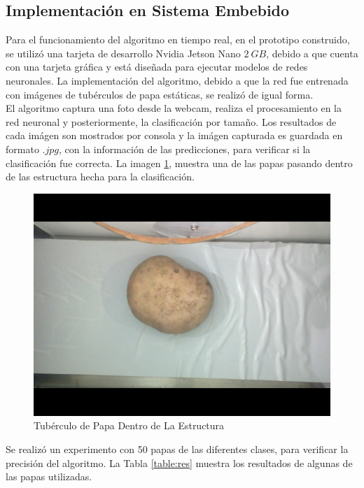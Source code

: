 	
	\subsection{Implementación en Sistema Embebido}
	
	Para el funcionamiento del algoritmo en tiempo real, en el prototipo construido, se utilizó una tarjeta de desarrollo Nvidia Jetson Nano $2 \ GB$, debido a que cuenta con una tarjeta gráfica y está diseñada para ejecutar modelos de redes neuronales. La implementación del algoritmo, debido a que la red fue entrenada con imágenes de tubérculos de papa estáticas, se realizó de igual forma.\\
	
	El algoritmo captura una foto desde la webcam, realiza el procesamiento en la red neuronal y posteriormente, la clasificación por tamaño. Los resultados de cada imágen son mostrados por consola y la imágen capturada es guardada en formato $.jpg$, con la información de las predicciones, para verificar si la clasificación fue correcta. La imagen \ref{fig:implementacion}, muestra una de las papas pasando dentro de las estructura hecha para la clasificación.
	
	\begin{figure}[ht]
		\centering
		\includegraphics[scale=0.25]{Figs/implementacion.jpg}
		\caption{Tubérculo de Papa Dentro de La Estructura}
		\label{fig:implementacion}
	\end{figure}

	\newpage
	Se realizó un experimento con 50 papas de las diferentes clases, para verificar la precisión del algoritmo. La Tabla \ref{table:res} muestra los resultados de algunas de las papas utilizadas.
	
